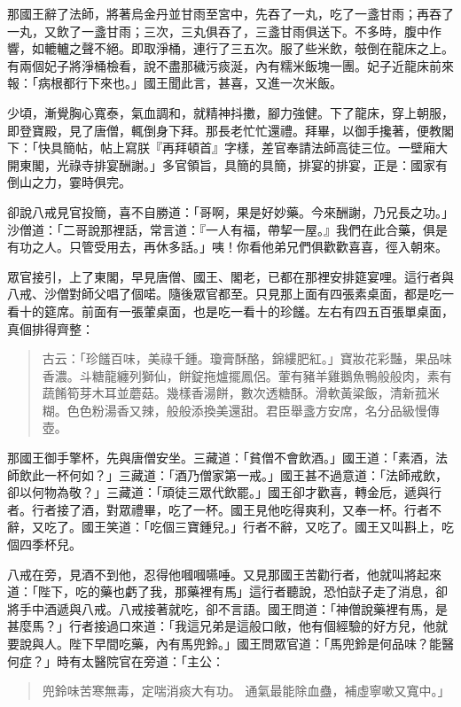 那國王辭了法師，將著烏金丹並甘雨至宮中，先吞了一丸，吃了一盞甘雨；再吞了一丸，又飲了一盞甘雨；三次，三丸俱吞了，三盞甘雨俱送下。不多時，腹中作響，如轆轤之聲不絕。即取淨桶，連行了三五次。服了些米飲，攲倒在龍床之上。有兩個妃子將淨桶檢看，說不盡那穢污痰涎，內有糯米飯塊一團。妃子近龍床前來報：「病根都行下來也。」國王聞此言，甚喜，又進一次米飯。

少頃，漸覺胸心寬泰，氣血調和，就精神抖擻，腳力強健。下了龍床，穿上朝服，即登寶殿，見了唐僧，輒倒身下拜。那長老忙忙還禮。拜畢，以御手攙著，便教閣下：「快具簡帖，帖上寫朕『再拜頓首』字樣，差官奉請法師高徒三位。一壁廂大開東閣，光祿寺排宴酬謝。」多官領旨，具簡的具簡，排宴的排宴，正是：國家有倒山之力，霎時俱完。

卻說八戒見官投簡，喜不自勝道：「哥啊，果是好妙藥。今來酬謝，乃兄長之功。」沙僧道：「二哥說那裡話，常言道：『一人有福，帶挈一屋。』我們在此合藥，俱是有功之人。只管受用去，再休多話。」咦！你看他弟兄們俱歡歡喜喜，徑入朝來。

眾官接引，上了東閣，早見唐僧、國王、閣老，已都在那裡安排筵宴哩。這行者與八戒、沙僧對師父唱了個喏。隨後眾官都至。只見那上面有四張素桌面，都是吃一看十的筵席。前面有一張葷桌面，也是吃一看十的珍饈。左右有四五百張單桌面，真個排得齊整：
\begin{quote}
古云：「珍饈百味，美祿千鍾。瓊膏酥酪，錦縷肥紅。」寶妝花彩豔，果品味香濃。斗糖龍纏列獅仙，餅錠拖爐擺鳳侶。葷有豬羊雞鵝魚鴨般般肉，素有蔬餚筍芽木耳並蘑菇。幾樣香湯餅，數次透糖酥。滑軟黃粱飯，清新菰米糊。色色粉湯香又辣，般般添換美還甜。君臣舉盞方安席，名分品級慢傳壺。
\end{quote}

那國王御手擎杯，先與唐僧安坐。三藏道：「貧僧不會飲酒。」國王道：「素酒，法師飲此一杯何如？」三藏道：「酒乃僧家第一戒。」國王甚不過意道：「法師戒飲，卻以何物為敬？」三藏道：「頑徒三眾代飲罷。」國王卻才歡喜，轉金卮，遞與行者。行者接了酒，對眾禮畢，吃了一杯。國王見他吃得爽利，又奉一杯。行者不辭，又吃了。國王笑道：「吃個三寶鍾兒。」行者不辭，又吃了。國王又叫斟上，吃個四季杯兒。

八戒在旁，見酒不到他，忍得他嘓嘓嚥唾。又見那國王苦勸行者，他就叫將起來道：「陛下，吃的藥也虧了我，那藥裡有馬」這行者聽說，恐怕獃子走了消息，卻將手中酒遞與八戒。八戒接著就吃，卻不言語。國王問道：「神僧說藥裡有馬，是甚麼馬？」行者接過口來道：「我這兄弟是這般口敞，他有個經驗的好方兒，他就要說與人。陛下早間吃藥，內有馬兜鈴。」國王問眾官道：「馬兜鈴是何品味？能醫何症？」時有太醫院官在旁道：「主公：
\begin{quote}
兜鈴味苦寒無毒，定喘消痰大有功。
通氣最能除血蠱，補虛寧嗽又寬中。」
\end{quote}

